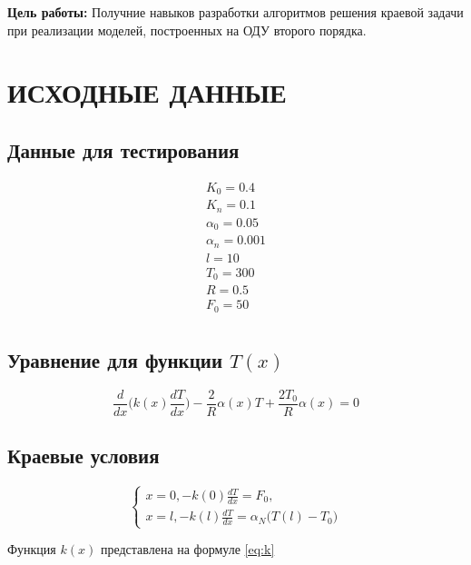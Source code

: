 \textbf{Цель работы:} Получние навыков разработки алгоритмов решения краевой задачи при реализации моделей, построенных на ОДУ второго порядка.

\section{ИСХОДНЫЕ ДАННЫЕ}

\subsection{Данные для тестирования}

\begin{equation*}
    \begin{matrix}
        K_0 = 0.4 \\
        K_n = 0.1 \\
        \alpha_0 = 0.05 \\
        \alpha_n = 0.001 \\
        l = 10 \\
        T_0 = 300 \\
        R = 0.5 \\
        F_0 = 50 \\
    \end{matrix}
\end{equation*}

\subsection{Уравнение для функции $T(x)$}

\begin{equation}\label{eq:t(x)}
    \frac{d}{dx} \bigg( k(x) \frac{dT}{dx} \bigg) - \frac{2}{R} \alpha(x)T +
    \frac{2T_0}{R} \alpha(x) = 0
\end{equation}

\subsection{Краевые условия}

\begin{equation*}
    \begin{cases}
        x = 0, -k(0) \frac{dT}{dx} = F_0, \\
        x = l, -k(l) \frac{dT}{dx} = \alpha_N \big( T(l) - T_0 \big)
    \end{cases}
\end{equation*}

Функция $k(x)$ представлена на формуле \ref{eq:k}

